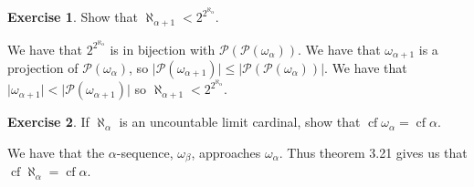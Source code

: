 \documentclass{article}
\theoremstyle{definition}
\newtheorem{exer}{Exercise}[section]
\newcommand{\powset}[1]{\mathcal{P}(#1)}
\DeclareMathOperator{\cf}{cf}
\newcommand{\abs}[1]{\lvert#1\rvert}
\newlength{\defparindent}
\newenvironment{answer}
    {\begin{mdframed}[backgroundcolor=gray!15, linewidth=0pt] \setlength{\parindent}{\defparindent}}
    {\end{mdframed}}
\begin{document}
\newpage

\begin{exer}
    Show that $\aleph_{\alpha + 1} < 2^{2^{\aleph_\alpha}}$.
    \begin{answer}
        We have that $2^{2^{\aleph_\alpha}}$ is in bijection with $\powset{\powset{\omega_\alpha}}$. We have that $\omega_{\alpha + 1}$ is a projection of $\powset{\omega_\alpha}$, so $\abs{\powset{\omega_{\alpha + 1}}} \le \abs{\powset{\powset{\omega_\alpha}}}$. We have that $\abs{\omega_{\alpha + 1}} < \abs{\powset{\omega_{\alpha + 1}}}$ so $\aleph_{\alpha + 1} < 2^{2^{\aleph_\alpha}}$.
    \end{answer}
\end{exer}

\begin{exer}
    If $\aleph_\alpha$ is an uncountable limit cardinal, show that $\cf \omega_\alpha = \cf \alpha$.
    \begin{answer}
        We have that the $\alpha$-sequence, $\omega_\beta$, approaches $\omega_\alpha$. Thus theorem 3.21 gives us that $\cf \aleph_\alpha = \cf \alpha$.
    \end{answer}
\end{exer}
\end{document}
